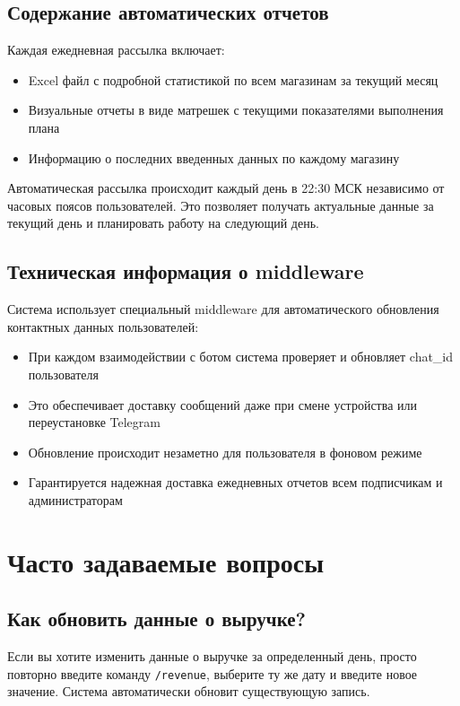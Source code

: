 \documentclass[a4paper,12pt]{article}
\begin{document}
\subsection{Содержание автоматических отчетов}
Каждая ежедневная рассылка включает:
\begin{itemize}
    \item Excel файл с подробной статистикой по всем магазинам за текущий месяц
    \item Визуальные отчеты в виде матрешек с текущими показателями выполнения плана
    \item Информацию о последних введенных данных по каждому магазину
\end{itemize}

\begin{tcolorbox}[colback=blue!5, title=Информация о расписании]
Автоматическая рассылка происходит каждый день в 22:30 МСК независимо от часовых поясов пользователей. Это позволяет получать актуальные данные за текущий день и планировать работу на следующий день.
\end{tcolorbox}

\subsection{Техническая информация о middleware}
Система использует специальный middleware для автоматического обновления контактных данных пользователей:
\begin{itemize}
    \item При каждом взаимодействии с ботом система проверяет и обновляет chat\_id пользователя
    \item Это обеспечивает доставку сообщений даже при смене устройства или переустановке Telegram
    \item Обновление происходит незаметно для пользователя в фоновом режиме
    \item Гарантируется надежная доставка ежедневных отчетов всем подписчикам и администраторам
\end{itemize}

\section{Часто задаваемые вопросы}

\subsection{Как обновить данные о выручке?}
Если вы хотите изменить данные о выручке за определенный день, просто повторно введите команду \texttt{/revenue}, выберите ту же дату и введите новое значение. Система автоматически обновит существующую запись.
\end{document}
